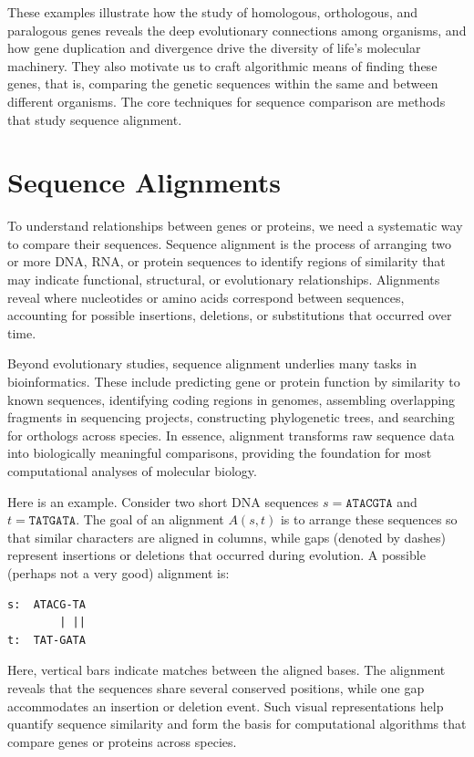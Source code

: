 These examples illustrate how the study of homologous, orthologous, and paralogous genes reveals the deep evolutionary connections among organisms, and how gene duplication and divergence drive the diversity of life’s molecular machinery. They also motivate us to craft algorithmic means of finding these genes, that is, comparing the genetic sequences within the same and between different organisms. The core techniques for sequence comparison are methods that study sequence alignment.

\section{Sequence Alignments}

To understand relationships between genes or proteins, we need a systematic way to compare their sequences. Sequence alignment is the process of arranging two or more DNA, RNA, or protein sequences to identify regions of similarity that may indicate functional, structural, or evolutionary relationships. Alignments reveal where nucleotides or amino acids correspond between sequences, accounting for possible insertions, deletions, or substitutions that occurred over time. 

Beyond evolutionary studies, sequence alignment underlies many tasks in bioinformatics. These include predicting gene or protein function by similarity to known sequences, identifying coding regions in genomes, assembling overlapping fragments in sequencing projects, constructing phylogenetic trees, and searching for orthologs across species. In essence, alignment transforms raw sequence data into biologically meaningful comparisons, providing the foundation for most computational analyses of molecular biology.

Here is an example. Consider two short DNA sequences $s = \texttt{ATACGTA}$ and $t = \texttt{TATGATA}$. The goal of an alignment $A(s,t)$ is to arrange these sequences so that similar characters are aligned in columns, while gaps (denoted by dashes) represent insertions or deletions that occurred during evolution. A possible (perhaps not a very good) alignment is:

\begin{verbatim}
s:  ATACG-TA
        | ||
t:  TAT-GATA
\end{verbatim}

Here, vertical bars indicate matches between the aligned bases. The alignment reveals that the sequences share several conserved positions, while one gap accommodates an insertion or deletion event. Such visual representations help quantify sequence similarity and form the basis for computational algorithms that compare genes or proteins across species.

